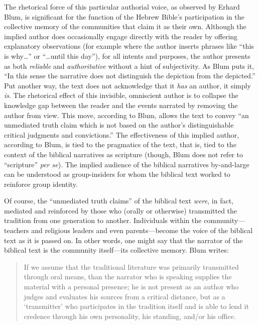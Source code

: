 The rhetorical force of this particular authorial voice, as observed by Erhard Blum, is significant for the function of the Hebrew Bible's participation in the collective memory of the communities that claim it as their own. Although the implied author does occasionally engage directly with the reader by offering explanatory observations (for example where the author inserts phrases like ``this is why\ldots{}'' or ``\ldots{}until this day''), for all intents and purposes, the author presents as both \emph{reliable} and \emph{authoritative} without a hint of subjectivity. As Blum puts it, ``In this sense the narrative does not distinguish the depiction from the depicted.''\autocite[33]{blum_barton-etal2007} Put another way, the text does not acknowledge that it \emph{has} an author, it simply \emph{is}. The rhetorical effect of this invisible, omniscient author is to collapse the knowledge gap between the reader and the events narrated by removing the author from view. This move, according to Blum, allows the text to convey ``an unmediated truth claim which is not based on the author's distinguishable critical judgments and convictions.''\autocite[33]{blum_barton-etal2007} The effectiveness of this implied author, according to Blum, is tied to the pragmatics of the text, that is, tied to the context of the biblical narratives as scripture (though, Blum does not refer to ``scripture'' \emph{per se}). The implied audience of the biblical narratives by-and-large can be understood as group-insiders for whom the biblical text worked to reinforce group identity.

Of course, the ``unmediated truth claims'' of the biblical text \emph{were}, in fact, mediated and reinforced by those who (orally or otherwise) transmitted the tradition from one generation to another.\autocite[33]{blum_barton-etal2007} Individuals within the community---teachers and religious leaders and even parents---become the voice of the biblical text as it is passed on. In other words, one might say that the narrator of the biblical text is the community itself---its collective memory. Blum writes:

\begin{quote}
If we assume that the traditional literature was primarily transmitted through oral means, than the narrator who is speaking supplies the material with a personal presence; he is not present as an author who judges and evaluates his sources from a critical distance, but as a `transmitter' who participates in the tradition itself and is able to lend it credence through his own personality, his standing, and/or his office.\cite[33]{blum_barton-etal2007}
\end{quote}

